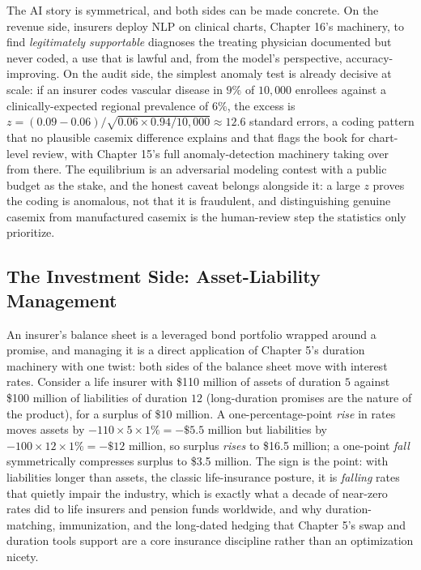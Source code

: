 \documentclass[../ai_in_finance]{subfiles}
\begin{document}
The AI story is symmetrical, and both sides can be made concrete. On the revenue side, insurers deploy NLP on clinical charts, Chapter 16's machinery, to find \emph{legitimately supportable} diagnoses the treating physician documented but never coded, a use that is lawful and, from the model's perspective, accuracy-improving. On the audit side, the simplest anomaly test is already decisive at scale: if an insurer codes vascular disease in $9\%$ of $10{,}000$ enrollees against a clinically-expected regional prevalence of $6\%$, the excess is $z = (0.09 - 0.06)/\sqrt{0.06 \times 0.94/10{,}000} \approx 12.6$ standard errors, a coding pattern that no plausible casemix difference explains and that flags the book for chart-level review, with Chapter 15's full anomaly-detection machinery taking over from there. The equilibrium is an adversarial modeling contest with a public budget as the stake, and the honest caveat belongs alongside it: a large $z$ proves the coding is anomalous, not that it is fraudulent, and distinguishing genuine casemix from manufactured casemix is the human-review step the statistics only prioritize.

\subsection{The Investment Side: Asset-Liability Management}
\label{sec:ins-alm}

An insurer's balance sheet is a leveraged bond portfolio wrapped around a promise, and managing it is a direct application of Chapter 5's duration machinery with one twist: both sides of the balance sheet move with interest rates. Consider a life insurer with \$110 million of assets of duration $5$ against \$100 million of liabilities of duration $12$ (long-duration promises are the nature of the product), for a surplus of \$10 million. A one-percentage-point \emph{rise} in rates moves assets by $-110 \times 5 \times 1\% = -\$5.5$ million but liabilities by $-100 \times 12 \times 1\% = -\$12$ million, so surplus \emph{rises} to \$16.5 million; a one-point \emph{fall} symmetrically compresses surplus to \$3.5 million. The sign is the point: with liabilities longer than assets, the classic life-insurance posture, it is \emph{falling} rates that quietly impair the industry, which is exactly what a decade of near-zero rates did to life insurers and pension funds worldwide, and why duration-matching, immunization, and the long-dated hedging that Chapter 5's swap and duration tools support are a core insurance discipline rather than an optimization nicety.
\end{document}
